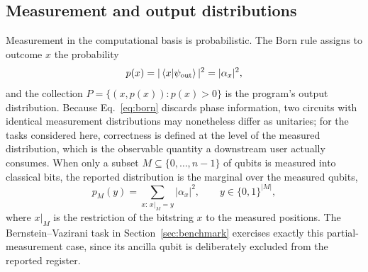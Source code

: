 \documentclass[11pt,a4paper]{article}
\begin{document}
\subsection{Measurement and output distributions}
Measurement in the computational basis is probabilistic. The Born rule assigns to outcome $x$ the probability
\begin{equation}
p(x)=|\braket{x|\psi_{\mathrm{out}}}|^{2}=|\alpha_{x}|^{2},
\label{eq:born}
\end{equation}
and the collection $P=\{(x,p(x)): p(x)>0\}$ is the program's output distribution. Because Eq.~\eqref{eq:born} discards phase information, two circuits with identical measurement distributions may nonetheless differ as unitaries; for the tasks considered here, correctness is defined at the level of the measured distribution, which is the observable quantity a downstream user actually consumes. When only a subset $M\subseteq\{0,\dots,n-1\}$ of qubits is measured into classical bits, the reported distribution is the marginal over the measured qubits,
\begin{equation}
p_{M}(y)=\sum_{x:\,x|_{M}=y}|\alpha_{x}|^{2},\qquad y\in\{0,1\}^{|M|},
\label{eq:marginal}
\end{equation}
where $x|_{M}$ is the restriction of the bitstring $x$ to the measured positions. The Bernstein--Vazirani task in Section~\ref{sec:benchmark} exercises exactly this partial-measurement case, since its ancilla qubit is deliberately excluded from the reported register.
\end{document}
